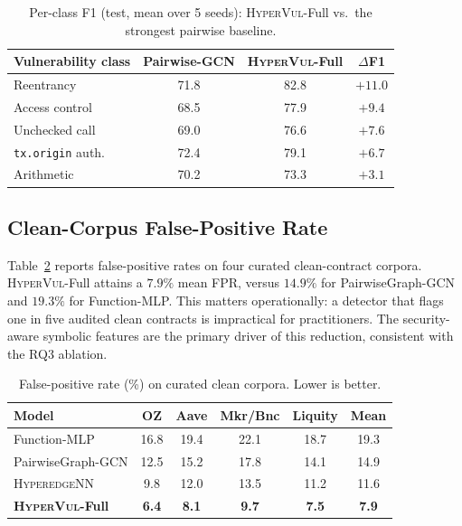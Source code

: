 \documentclass[conference]{IEEEtran}
\newcommand{\hypervul}{\textsc{HyperVul}}
\newcommand{\hyperedgenn}{\textsc{HyperedgeNN}}
\begin{document}
\begin{table}[t]
\caption{Per-class F1 (test, mean over 5 seeds): \hypervul{}-Full vs.\ the strongest
pairwise baseline.}
\label{tab:perclass}
\centering
\setlength{\tabcolsep}{3.0pt}
\renewcommand{\arraystretch}{1.12}
\begin{tabular}{lccc}
\toprule
Vulnerability class & Pairwise-GCN & \hypervul{}-Full & $\Delta$F1 \\
\midrule
Reentrancy             & 71.8 & 82.8 & $+11.0$ \\
Access control         & 68.5 & 77.9 & $+9.4$  \\
Unchecked call         & 69.0 & 76.6 & $+7.6$  \\
\texttt{tx.origin} auth.& 72.4 & 79.1 & $+6.7$  \\
Arithmetic             & 70.2 & 73.3 & $+3.1$  \\
\bottomrule
\end{tabular}
\end{table}

\subsection{Clean-Corpus False-Positive Rate}
Table~\ref{tab:fpr} reports false-positive rates on four curated clean-contract
corpora. \hypervul{}-Full attains a $7.9\%$ mean FPR, versus $14.9\%$ for
PairwiseGraph-GCN and $19.3\%$ for Function-MLP. This matters operationally: a
detector that flags one in five audited clean contracts is impractical for
practitioners. The security-aware symbolic features are the primary driver of this
reduction, consistent with the RQ3 ablation.

\begin{table}[t]
\caption{False-positive rate (\%) on curated clean corpora. Lower is better.}
\label{tab:fpr}
\centering
\setlength{\tabcolsep}{3.0pt}
\renewcommand{\arraystretch}{1.12}
\begin{tabular}{lccccc}
\toprule
Model & OZ & Aave & Mkr/Bnc & Liquity & Mean \\
\midrule
Function-MLP       & 16.8 & 19.4 & 22.1 & 18.7 & 19.3 \\
PairwiseGraph-GCN  & 12.5 & 15.2 & 17.8 & 14.1 & 14.9 \\
\hyperedgenn{}     & 9.8  & 12.0 & 13.5 & 11.2 & 11.6 \\
\textbf{\hypervul{}-Full} & \textbf{6.4} & \textbf{8.1} & \textbf{9.7}
  & \textbf{7.5} & \textbf{7.9} \\
\bottomrule
\end{tabular}
\end{table}
\end{document}
